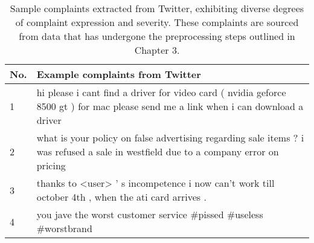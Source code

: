 \begin{table}[ht]
    \captionsetup{font=small}
    \small
    \centering
    \begin{tabularx}{\textwidth}{|l|X|}
        \hline
        \rowcolor[gray]{0.7}
        \textbf{No.} & \textbf{Example complaints from Twitter}                                                                                            \\
        \hline
        1            & hi please i cant find a driver for video card ( nvidia geforce 8500 gt ) for mac please send me a link when i can download a driver \\
        \rowcolor[gray]{0.9}
        2            & what is your policy on false advertising regarding sale items ? i was refused a sale in westfield due to a company error on pricing \\
        3            & thanks to <user> ' s incompetence i now can't work till october 4th , when the ati card arrives .                                   \\
        \rowcolor[gray]{0.9}
        4            & you jave the worst customer service \! \! \! \#pissed \#useless \#worstbrand                                                        \\
        \hline
    \end{tabularx}
    \caption{Sample complaints extracted from Twitter, exhibiting diverse degrees of complaint expression and severity. These complaints are sourced from data that has undergone the preprocessing steps outlined in Chapter 3.}
    \label{tab: ex_complaints}
\end{table}

